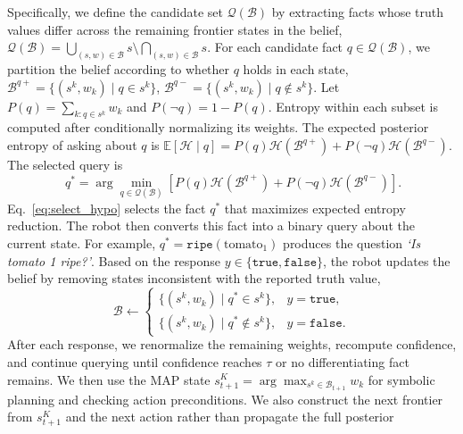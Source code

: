Specifically, we define the candidate set $\mathcal{Q}(\mathcal{B})$ by extracting facts whose truth values differ across the remaining frontier states in the belief,
$\mathcal{Q}(\mathcal{B}) = \bigcup_{(s,w)\in\mathcal{B}}s \setminus \bigcap_{(s,w)\in\mathcal{B}}s.$
For each candidate fact $q\in\mathcal{Q}(\mathcal{B})$, we partition the belief according to whether $q$ holds in each state,
$\mathcal{B}^{q+}=\{(s^k,w_k)\mid q\in s^k\}$, $\mathcal{B}^{q-}=\{(s^k,w_k)\mid q\notin s^k\}.$
Let $P(q)=\sum_{k:q\in s^k}w_k$ and $P(\neg q)=1-P(q)$. Entropy within each subset is computed after conditionally normalizing its weights. The expected posterior entropy of asking about $q$ is
$\mathbb{E}[\mathcal{H}\mid q] = P(q)\mathcal{H}(\mathcal{B}^{q+}) + P(\neg q)\mathcal{H}(\mathcal{B}^{q-}).$
The selected query is
\begin{equation}~\label{eq:select_hypo}
q^* = \arg\min_{q\in\mathcal{Q}(\mathcal{B})} \left[P(q)\mathcal{H}(\mathcal{B}^{q+})+P(\neg q)\mathcal{H}(\mathcal{B}^{q-})\right].
\end{equation}
Eq.~\eqref{eq:select_hypo} selects the fact $q^*$ that maximizes expected entropy reduction. The robot then converts this fact into a binary query about the current state. For example, $q^*=\texttt{ripe}(\text{tomato}_1)$ produces the question \textit{`Is tomato 1 ripe?'}. Based on the response $y\in\{\texttt{true},\texttt{false}\}$, the robot updates the belief by removing states inconsistent with the reported truth value,
\begin{equation}
\mathcal{B}
\leftarrow
\begin{cases}
\{(s^k,w_k)\mid q^*\in s^k\}, & y=\texttt{true},\\
\{(s^k,w_k)\mid q^*\notin s^k\}, & y=\texttt{false}.
\end{cases}
\label{eq:filter}
\end{equation}
After each response, we renormalize the remaining weights, recompute confidence, and continue querying until confidence reaches \(\tau\) or no differentiating fact remains. We then use the MAP state \(s_{t+1}^{K} = \arg\max_{s^k\in\mathcal{B}_{t+1}}w_k\) for symbolic planning and checking action preconditions. We also construct the next frontier from \(s_{t+1}^{K}\) and the next action rather than propagate the full posterior 




